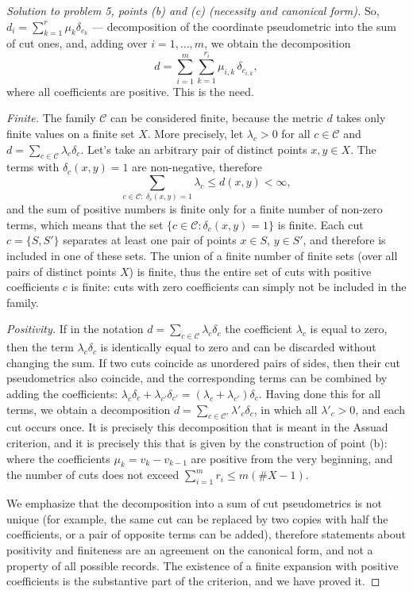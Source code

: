 \documentclass[a4paper,12pt]{report}
\begin{document}
\begin{proof}[Solution to problem \textup{5}, points \textup{(b)} and \textup{(c)} \textup{(}necessity and canonical form\textup{)}]
So, $d_i=\sum_{k=1}^{r}\mu_k\delta_{c_k}$ --- decomposition of the coordinate pseudometric into the sum of cut ones, and, adding over $i=1,\dots,m$, we obtain the decomposition
\[
d=\sum_{i=1}^m\sum_{k=1}^{r_i}\mu_{i,k}\,\delta_{c_{i,k}},
\]
where all coefficients are positive. This is the need.

\textit{Finite.} The family $\mathcal C$ can be considered finite, because the metric $d$ takes only finite values on a finite set $X$. More precisely, let $\lambda_c>0$ for all $c\in\mathcal C$ and $d=\sum_{c\in\mathcal C}\lambda_c\delta_c$. Let's take an arbitrary pair of distinct points $x,y\in X$. The terms with $\delta_c(x,y)=1$ are non-negative, therefore
\[
\sum_{c\in\mathcal C:\ \delta_c(x,y)=1}\lambda_c\le d(x,y)<\infty,
\]
and the sum of positive numbers is finite only for a finite number of non-zero terms, which means that the set $\{c\in\mathcal C:\delta_c(x,y)=1\}$ is finite. Each cut $c=\{S,S'\}$ separates at least one pair of points $x\in S$, $y\in S'$, and therefore is included in one of these sets. The union of a finite number of finite sets (over all pairs of distinct points $X$) is finite, thus the entire set of cuts with positive coefficients $c$ is finite\textup{:} cuts with zero coefficients can simply not be included in the family.

\textit{Positivity.} If in the notation $d=\sum_{c\in\mathcal C}\lambda_c\delta_c$ the coefficient $\lambda_c$ is equal to zero, then the term $\lambda_c\delta_c$ is identically equal to zero and can be discarded without changing the sum. If two cuts coincide as unordered pairs of sides, then their cut pseudometrics also coincide, and the corresponding terms can be combined by adding the coefficients\textup{:} $\lambda_c\delta_c+\lambda_{c'}\delta_{c'}=(\lambda_c+\lambda_{c'})\delta_c$. Having done this for all terms, we obtain a decomposition $d=\sum_{c\in\mathcal C'}\lambda'_c\delta_c$, in which all $\lambda'_c>0$, and each cut occurs once. It is precisely this decomposition that is meant in the Assuad criterion, and it is precisely this that is given by the construction of point \textup{(b)}\textup{:} where the coefficients $\mu_k=v_k-v_{k-1}$ are positive from the very beginning, and the number of cuts does not exceed $\sum_{i=1}^m r_i\le m(\#X-1)$.

We emphasize that the decomposition into a sum of cut pseudometrics is not unique (for example, the same cut can be replaced by two copies with half the coefficients, or a pair of opposite terms can be added), therefore statements about positivity and finiteness are an agreement on the canonical form, and not a property of all possible records. The existence of a finite expansion with positive coefficients is the substantive part of the criterion, and we have proved it.
\end{proof}
\end{document}
